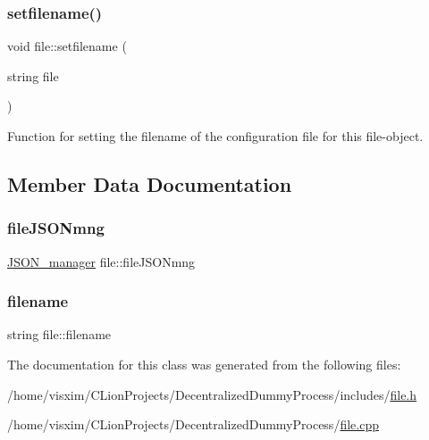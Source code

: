 \subsubsection{\texorpdfstring{setfilename()}{setfilename()}}
{\footnotesize\ttfamily void file\+::setfilename (\begin{DoxyParamCaption}\item[{string}]{file }\end{DoxyParamCaption})}



Function for setting the filename of the configuration file for this file-\/object. 



\subsection{Member Data Documentation}
\mbox{\label{classfile_aaba2c5a6566d9cbbc9fb613475eb1ce7}} 
\subsubsection{\texorpdfstring{file\+J\+S\+O\+Nmng}{fileJSONmng}}
{\footnotesize\ttfamily \hyperlink{classJSON__manager}{J\+S\+O\+N\+\_\+manager} file\+::file\+J\+S\+O\+Nmng}

\mbox{\label{classfile_a9117ee5ddda3538f631fe96252de70fc}} 
\subsubsection{\texorpdfstring{filename}{filename}}
{\footnotesize\ttfamily string file\+::filename\hspace{0.3cm}{\ttfamily [private]}}



The documentation for this class was generated from the following files\+:\begin{DoxyCompactItemize}
\item 
/home/visxim/\+C\+Lion\+Projects/\+Decentralized\+Dummy\+Process/includes/\hyperlink{file_8h}{file.\+h}\item 
/home/visxim/\+C\+Lion\+Projects/\+Decentralized\+Dummy\+Process/\hyperlink{file_8cpp}{file.\+cpp}\end{DoxyCompactItemize}
